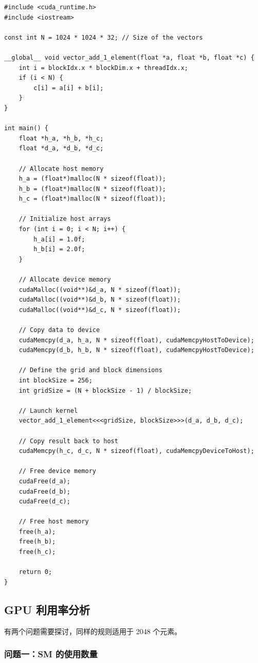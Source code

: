 \begin{lstlisting}
#include <cuda_runtime.h>
#include <iostream>

const int N = 1024 * 1024 * 32; // Size of the vectors

__global__ void vector_add_1_element(float *a, float *b, float *c) {
    int i = blockIdx.x * blockDim.x + threadIdx.x;
    if (i < N) {
        c[i] = a[i] + b[i];
    }
}

int main() {
    float *h_a, *h_b, *h_c;
    float *d_a, *d_b, *d_c;

    // Allocate host memory
    h_a = (float*)malloc(N * sizeof(float));
    h_b = (float*)malloc(N * sizeof(float));
    h_c = (float*)malloc(N * sizeof(float));

    // Initialize host arrays
    for (int i = 0; i < N; i++) {
        h_a[i] = 1.0f;
        h_b[i] = 2.0f;
    }

    // Allocate device memory
    cudaMalloc((void**)&d_a, N * sizeof(float));
    cudaMalloc((void**)&d_b, N * sizeof(float));
    cudaMalloc((void**)&d_c, N * sizeof(float));

    // Copy data to device
    cudaMemcpy(d_a, h_a, N * sizeof(float), cudaMemcpyHostToDevice);
    cudaMemcpy(d_b, h_b, N * sizeof(float), cudaMemcpyHostToDevice);

    // Define the grid and block dimensions
    int blockSize = 256;
    int gridSize = (N + blockSize - 1) / blockSize;

    // Launch kernel
    vector_add_1_element<<<gridSize, blockSize>>>(d_a, d_b, d_c);

    // Copy result back to host
    cudaMemcpy(h_c, d_c, N * sizeof(float), cudaMemcpyDeviceToHost);

    // Free device memory
    cudaFree(d_a);
    cudaFree(d_b);
    cudaFree(d_c);

    // Free host memory
    free(h_a);
    free(h_b);
    free(h_c);

    return 0;
}

\end{lstlisting}

\subsection{GPU 利用率分析}

有两个问题需要探讨，同样的规则适用于 2048 个元素。

\subsubsection{问题一：SM 的使用数量}

